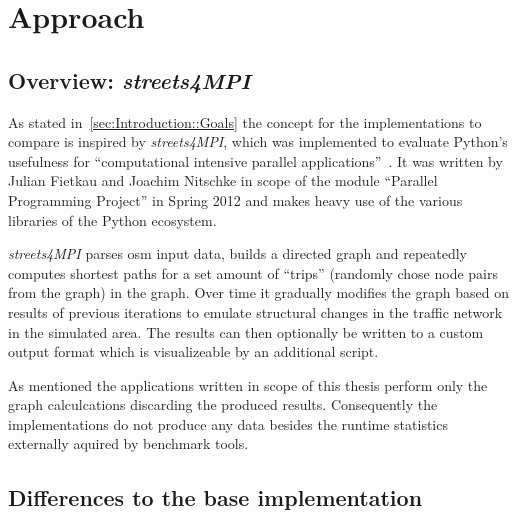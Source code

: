 \chapter{Approach}
\label{ch:Approach}


\section{Overview: \textit{streets4MPI}}
\label{sec:Approach::Overview}

As stated in~\autoref{sec:Introduction::Goals} the concept for the implementations to compare is inspired by \textit{streets4MPI}, which was implemented to evaluate Python's usefulness for ``computational intensive parallel applications''~\cite[p.3]{streets_report}. It was written by Julian Fietkau and Joachim Nitschke in scope of the module ``Parallel Programming Project'' in Spring 2012 and makes heavy use of the various libraries of the Python ecosystem.

\textit{streets4MPI} parses \gls{osm} input data, builds a directed graph and repeatedly computes shortest paths for a set amount of ``trips'' (randomly chose node pairs from the graph) in the graph. Over time it gradually modifies the graph based on results of previous iterations to emulate structural changes in the traffic network in the simulated area. The results can then optionally be written to a custom output format which is visualizeable by an additional script.~\cite{streets_report}

As mentioned the applications written in scope of this thesis perform only the graph calculcations discarding the produced results. Consequently the implementations do not produce any data besides the runtime statistics externally aquired by benchmark tools.


\section{Differences to the base implementation}
\label{sec:Approach::Differences}

